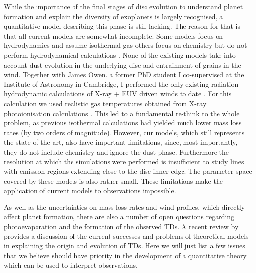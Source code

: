 \documentclass[10pt,fleqn,twoside]{article}
\begin{document}
While the importance of the final stages
of disc evolution to understand planet formation and explain the
diversity of exoplanets is largely recognised, a quantitative model describing this phase is
still lacking. The reason for that is that all current models are
somewhat 
incomplete. Some models focus on hydrodynamics and 
assume isothermal gas 
\citep[e.g.\ the EUV-only model of][]{2004ApJ...607..890F}
others focus on
chemistry but do not perform hydrodynamical calculations 
\citep[e.g.\ the FUV model of][]{2009ApJ...705.1237G}.
None of the existing models take into
account dust evolution in the underlying disc and entrainment of
grains in the wind. Together with James Owen, a former PhD student I co-supervised
at the Institute of Astronomy in Cambridge, I performed
the only existing radiation hydrodynamic calculations of X-ray  + EUV driven
winds to date 
\citep{2010MNRAS.401.1415O, 2011MNRAS.412...13O,
  2012MNRAS.422.1880O}. For this calculation
we used realistic gas
temperatures obtained from X-ray photoionisation calculations
\citep{2008ApJ...688..398E, 2009ApJ...699.1639E}.
This led to a fundamental re-think to the
whole problem, as previous isothermal calculations had yielded much
lower mass loss rates (by two orders of magnitude). However, our
models, which still represents the state-of-the-art, also have
important limitations, since, most importantly, they do not include
chemistry and ignore the dust phase. Furthermore the resolution at
which the simulations were performed is insufficient to study lines with
emission regions extending close to the disc inner edge. The parameter
space covered by these models is also rather small. These
limitations make the application of current models to observations
impossible.  

As well as the uncertainties on mass loss rates and wind profiles,
which directly affect planet formation, there are also a number of
open questions regarding photoevaporation and the formation of the
observed TDs. A recent review by 
\citet{2016PASA...33....5O}
provides a discussion of
the current successes and problems of theoretical models in
explaining the origin and evolution of TDs. Here we will just list a
few issues that we believe should have priority in the development of a
quantitative theory which can be used to interpret observations. 
\end{document}
